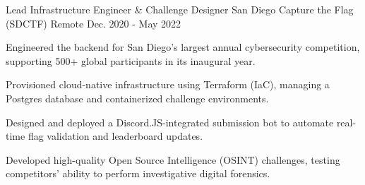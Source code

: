\begin{cventries}
  \cventry
    {Lead Infrastructure Engineer \& Challenge Designer} 
    {San Diego Capture the Flag (SDCTF)} 
    {Remote} 
    {Dec. 2020 - May 2022} 
    {
      \begin{cvitems}
          \item{Engineered the backend for San Diego's largest annual cybersecurity competition, supporting 500+ global participants in its inaugural year.}
          \item {Provisioned cloud-native infrastructure using Terraform (IaC), managing a Postgres database and containerized challenge environments.}
          \item {Designed and deployed a Discord.JS-integrated submission bot to automate real-time flag validation and leaderboard updates.}
          \item {Developed high-quality Open Source Intelligence (OSINT) challenges, testing competitors' ability to perform investigative digital forensics.}
      \end{cvitems}
    }
\end{cventries}